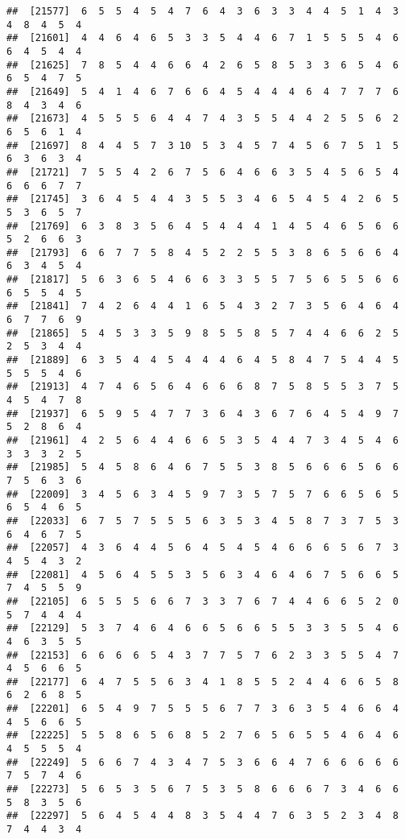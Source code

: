 \documentclass[
]{book}
\begin{document}
\begin{verbatim}
##  [21577]  6  5  5  4  5  4  7  6  4  3  6  3  3  4  4  5  1  4  3  4  8  4  5  4
##  [21601]  4  4  6  4  6  5  3  3  5  4  4  6  7  1  5  5  5  4  6  6  4  5  4  4
##  [21625]  7  8  5  4  4  6  6  4  2  6  5  8  5  3  3  6  5  4  6  6  5  4  7  5
##  [21649]  5  4  1  4  6  7  6  6  4  5  4  4  4  6  4  7  7  7  6  8  4  3  4  6
##  [21673]  4  5  5  5  6  4  4  7  4  3  5  5  4  4  2  5  5  6  2  6  5  6  1  4
##  [21697]  8  4  4  5  7  3 10  5  3  4  5  7  4  5  6  7  5  1  5  6  3  6  3  4
##  [21721]  7  5  5  4  2  6  7  5  6  4  6  6  3  5  4  5  6  5  4  6  6  6  7  7
##  [21745]  3  6  4  5  4  4  3  5  5  3  4  6  5  4  5  4  2  6  5  5  3  6  5  7
##  [21769]  6  3  8  3  5  6  4  5  4  4  4  1  4  5  4  6  5  6  6  5  2  6  6  3
##  [21793]  6  6  7  7  5  8  4  5  2  2  5  5  3  8  6  5  6  6  4  6  3  4  5  4
##  [21817]  5  6  3  6  5  4  6  6  3  3  5  5  7  5  6  5  5  6  6  6  5  5  4  5
##  [21841]  7  4  2  6  4  4  1  6  5  4  3  2  7  3  5  6  4  6  4  6  7  7  6  9
##  [21865]  5  4  5  3  3  5  9  8  5  5  8  5  7  4  4  6  6  2  5  2  5  3  4  4
##  [21889]  6  3  5  4  4  5  4  4  4  6  4  5  8  4  7  5  4  4  5  5  5  5  4  6
##  [21913]  4  7  4  6  5  6  4  6  6  6  8  7  5  8  5  5  3  7  5  4  5  4  7  8
##  [21937]  6  5  9  5  4  7  7  3  6  4  3  6  7  6  4  5  4  9  7  5  2  8  6  4
##  [21961]  4  2  5  6  4  4  6  6  5  3  5  4  4  7  3  4  5  4  6  3  3  3  2  5
##  [21985]  5  4  5  8  6  4  6  7  5  5  3  8  5  6  6  6  5  6  6  7  5  6  3  6
##  [22009]  3  4  5  6  3  4  5  9  7  3  5  7  5  7  6  6  5  6  5  6  5  4  6  5
##  [22033]  6  7  5  7  5  5  5  6  3  5  3  4  5  8  7  3  7  5  3  6  4  6  7  5
##  [22057]  4  3  6  4  4  5  6  4  5  4  5  4  6  6  6  5  6  7  3  4  5  4  3  2
##  [22081]  4  5  6  4  5  5  3  5  6  3  4  6  4  6  7  5  6  6  5  7  4  5  5  9
##  [22105]  6  5  5  5  6  6  7  3  3  7  6  7  4  4  6  6  5  2  0  5  7  4  4  4
##  [22129]  5  3  7  4  6  4  6  6  5  6  6  5  5  3  3  5  5  4  6  4  6  3  5  5
##  [22153]  6  6  6  6  5  4  3  7  7  5  7  6  2  3  3  5  5  4  7  4  5  6  6  5
##  [22177]  6  4  7  5  5  6  3  4  1  8  5  5  2  4  4  6  6  5  8  6  2  6  8  5
##  [22201]  6  5  4  9  7  5  5  5  6  7  7  3  6  3  5  4  6  6  4  4  5  6  6  5
##  [22225]  5  5  8  6  5  6  8  5  2  7  6  5  6  5  5  4  6  4  6  4  5  5  5  4
##  [22249]  5  6  6  7  4  3  4  7  5  3  6  6  4  7  6  6  6  6  6  7  5  7  4  6
##  [22273]  5  6  5  3  5  6  7  5  3  5  8  6  6  6  7  3  4  6  6  5  8  3  5  6
##  [22297]  5  6  4  5  4  4  8  3  5  4  4  7  6  3  5  2  3  4  8  7  4  4  3  4

\end{verbatim}
\end{document}
